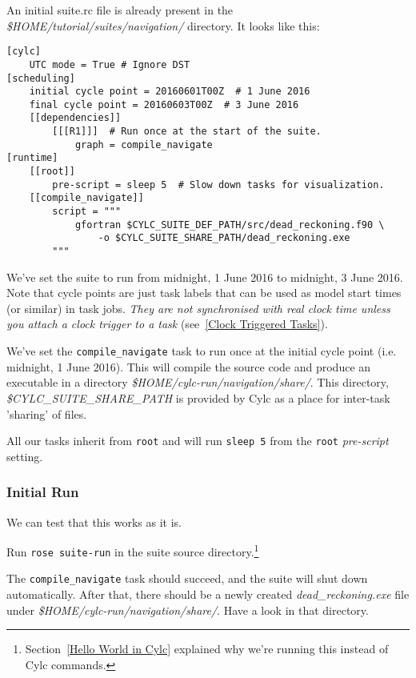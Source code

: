 An initial suite.rc file is already present in the {\em \$HOME/tutorial/suites/navigation/} directory.
It looks like this:

\lstset{language=suiterc}
\begin{lstlisting}[columns=fullflexible]
[cylc]
    UTC mode = True # Ignore DST
[scheduling]
    initial cycle point = 20160601T00Z  # 1 June 2016
    final cycle point = 20160603T00Z  # 3 June 2016
    [[dependencies]]
        [[[R1]]]  # Run once at the start of the suite.
            graph = compile_navigate
[runtime]
    [[root]]
        pre-script = sleep 5  # Slow down tasks for visualization.
    [[compile_navigate]]
        script = """
            gfortran $CYLC_SUITE_DEF_PATH/src/dead_reckoning.f90 \
                -o $CYLC_SUITE_SHARE_PATH/dead_reckoning.exe
        """
\end{lstlisting}

    We've set the suite to run from midnight, 1 June 2016 to midnight, 3 June
    2016. Note that cycle points are just task labels that can be used as
    model start times (or similar) in task jobs. {\em They are not synchronised
    with real clock time unless you attach a clock trigger to a task}
    (see~\ref{Clock Triggered Tasks}).
 
    We've set the \lstinline{compile_navigate} task to run once at the initial cycle point (i.e. midnight, 1 June 2016). This will compile the source code and produce an executable in a directory {\em \$HOME/cylc-run/navigation/share/}. This directory, {\em \$CYLC\_SUITE\_SHARE\_PATH} is provided by Cylc as a place for inter-task 'sharing' of files.

    All our tasks inherit from \lstinline{root} and will run \lstinline{sleep 5} from the \lstinline{root} {\em pre-script} setting.

\subsubsection{Initial Run}

    We can test that this works as it is.
    
    Run \lstinline{rose suite-run} in the suite source directory.\footnote {Section~\ref{Hello World in Cylc} explained why we're running this instead of Cylc commands.}
    
    The \lstinline{compile_navigate} task should succeed, and the suite will shut down automatically. After that, there should be a newly created {\em dead\_reckoning.exe} file under {\em \$HOME/cylc-run/navigation/share/}. Have a look in that directory.

